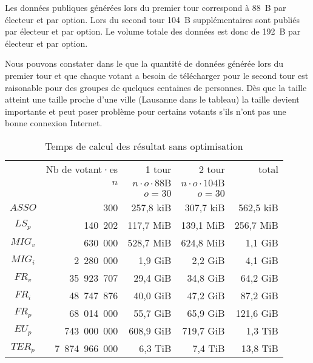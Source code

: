 \documentclass[../report]{subfiles}
\begin{document}
Les données publiques générées lors du premier tour correspond à 88~B par électeur et par option.
Lors du second tour 104~B supplémentaires sont publiés par électeur et par option.
Le volume totale des données est donc de 192~B par électeur et par option.

Nous pouvons constater dans le  que la quantité de données générée lors du premier tour et
que chaque votant a besoin de télécharger pour le second tour est raisonable pour des groupes de quelques centaines de personnes.
Dès que la taille atteint une taille proche d'une ville (Lausanne dans le tableau) la taille devient importante et peut poser
problème pour certains votants s'ils n'ont pas une bonne connexion Internet.

\begin{table}[H]
  \begin{center}
    \begin{tabular}{|c|r|r|r|r|}
      \hline
       & Nb de votant·es      & 1\up{er} tour                & 2\up{nd} tour & total\\
       & $n$                  & $n \cdot o \cdot 88\text{B}$ & $n \cdot o \cdot 104\text{B}$  &  \\
      \hline
       &                      & $o = 30$ & $o = 30$ &                    \\
      \hline
      \hline
      $ASSO$  &           300 & 257,8 kiB & 307,7 kiB & 562,5 kiB \\
      $LS_p$  &       140~202 & 117,7 MiB & 139,1 MiB & 256,7 MiB \\
      $MIG_v$ &       630~000 & 528,7 MiB & 624,8 MiB &   1,1 GiB \\
      $MIG_i$ &     2~280~000 &   1,9 GiB &   2,2 GiB &   4,1 GiB \\
      $FR_v$  &    35~923~707 &  29,4 GiB &  34,8 GiB &  64,2 GiB \\
      $FR_i$  &    48~747~876 &  40,0 GiB &  47,2 GiB &  87,2 GiB \\
      $FR_p$  &    68~014~000 &  55,7 GiB &  65,9 GiB & 121,6 GiB \\
      $EU_p$  &   743~000~000 & 608,9 GiB & 719,7 GiB &   1,3 TiB \\
      $TER_p$ & 7~874~966~000 &   6,3 TiB &   7,4 TiB &  13,8 TiB \\
      \hline
    \end{tabular}
  \end{center}
  \caption{Temps de calcul des résultat sans optimisation}\label{tab:res:perf:size}
\end{table}
\end{document}
